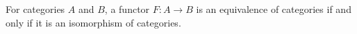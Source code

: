 \documentclass[hott-all.tex]{subfiles}
\begin{document}

\begin{lem}\label{ct:eqv-levelwise}
  For categories $A$ and $B$, a functor $F:A\to B$ is an equivalence of categories if and only if it is an isomorphism of categories.
\end{lem}
%
%
\end{document}
